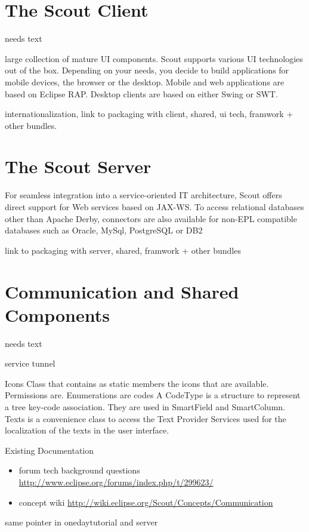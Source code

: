 \documentclass[a4paper,10pt,twoside]{book}
\begin{document}
\section{The Scout Client}
needs text

 large collection of mature UI components.
 Scout supports various UI technologies out of the box. 
 Depending on your needs, you decide to build applications for
mobile devices, the browser or the desktop. Mobile and
web applications are based on Eclipse RAP. Desktop clients
are based on either Swing or SWT.

internationalization, link to packaging with client, shared, ui tech, framwork + other bundles. 

\section{The Scout Server}

For seamless integration into a service-oriented IT architecture, Scout offers direct support for Web services based on
JAX-WS. To access relational databases other than Apache
Derby, connectors are also available for non-EPL compatible databases such as Oracle, MySql, PostgreSQL or DB2

link to packaging with server, shared, framwork + other bundles

\section{Communication and Shared Components}
needs text

service tunnel

Icons Class that contains as static members the icons that are available. 
Permissions are.
Enumerations are codes A CodeType is a structure to represent a tree key-code association. 
They are used in SmartField and SmartColumn. 
Texts is a convenience class to access the Text Provider Services used for the localization of the texts in the user interface. 


\noindent Existing Documentation
\begin{itemize}
  \item forum tech background questions \url{http://www.eclipse.org/forums/index.php/t/299623/}
  \item concept wiki \url{http://wiki.eclipse.org/Scout/Concepts/Communication}
\end{itemize}

same pointer in onedaytutorial and server


\ifx\wholebook\relax\else
   
   
\end{document}
